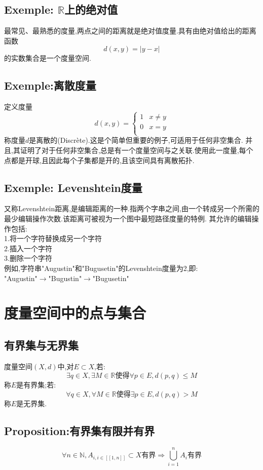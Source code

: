 \documentclass[12pt, a4paper, oneside]{ctexbook}
\newcommand{\R }{\mathbb{R}}%
\begin{document}
  \subsection{Exemple: $\R$上的绝对值}
  最常见、最熟悉的度量,两点之间的距离就是绝对值度量.具有由绝对值给出的距离函数
  $$
  d(x,y) = \vert y - x \vert
  $$
  的实数集合是一个度量空间.

  \subsection{Exemple:离散度量}     \label{myref:lisanduliang}
  定义度量
  $$
  d(x,y)=
  \begin{cases}
    1 & x\neq y\\
    0 & x=y\\
  \end{cases}
  $$
  称度量$d$是离散的(Discrète).这是个简单但重要的例子,可适用于任何非空集合.
  并且,其证明了对于任何非空集合,总是有一个度量空间与之关联.使用此一度量,每个点都是开球,且因此每个子集都是开的,且该空间具有离散拓扑.
  
  \subsection{Exemple: Levenshtein度量}
  又称Levenshtein距离,是编辑距离的一种.指两个字串之间,由一个转成另一个所需的最少编辑操作次数.该距离可被视为一个图中最短路径度量的特例.
  其允许的编辑操作包括:\\
  1.将一个字符替换成另一个字符\\
  2.插入一个字符\\
  3.删除一个字符\\
  例如,字符串"Augustin"和"Bugusetin"的Levenshtein度量为2,即:\\
  
  "Augustin"$\rightarrow$"Bugustin"$\rightarrow$"Bugusetin"


\section{度量空间中的点与集合}
  \subsection{有界集与无界集}
  度量空间$(X,d)$中,对$E\subset X$,若:
  $$
    \exists q\in X , \exists M\in \R\text{使得}\forall p\in E,d(p,q)\leq M
  $$称$E$是有界集;若:
  $$
    \forall q\in X , \forall M\in \R\text{使得}\exists p\in E,d(p,q)> M
  $$称$E$是无界集.
  \subsection{Proposition:有界集有限并有界}
  $$
  \forall n\in \mathbb{N},A_{i,i\in [\![1,n]\!]}\subset X\text{有界}\Rightarrow \bigcup_{i=1}^n A_i\text{有界}
  $$
\end{document}
